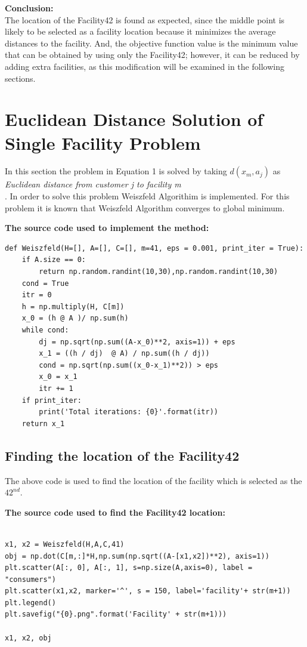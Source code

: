 \documentclass[12pt]{article}
\begin{document}
\textbf{Conclusion:}\\
The location of the Facility42 is found as expected, since the middle point is likely to be selected as a facility location because it minimizes the average distances to the facility. And, the objective function value is the minimum value that can be obtained by using only the Facility42; however, it can be reduced by adding extra facilities, as this modification will be examined in the following sections.

\section{Euclidean Distance Solution of Single Facility Problem}
In this section the problem in Equation 1 is solved by taking $d(x_m,a_j)$  as \textit{Euclidean distance from customer j to facility m} \\. In order to solve this problem Weiszfeld Algorithim is implemented. For this problem it is known that Weiszfeld Algorithm converges to global minimum.

\textbf{The source code used to implement the method:}
\begin{lstlisting}[style=pythonstyle]
def Weiszfeld(H=[], A=[], C=[], m=41, eps = 0.001, print_iter = True):
    if A.size == 0:
        return np.random.randint(10,30),np.random.randint(10,30)
    cond = True
    itr = 0
    h = np.multiply(H, C[m])
    x_0 = (h @ A )/ np.sum(h)
    while cond:
        dj = np.sqrt(np.sum((A-x_0)**2, axis=1)) + eps
        x_1 = ((h / dj)  @ A) / np.sum((h / dj))
        cond = np.sqrt(np.sum((x_0-x_1)**2)) > eps
        x_0 = x_1
        itr += 1
    if print_iter:
        print('Total iterations: {0}'.format(itr))
    return x_1
\end{lstlisting}

\subsection{Finding the location of the Facility42}
The above code is used to find the location of the facility which is selected as the $42^{nd}$. 

\textbf{The source code used to find the Facility42 location:}
\begin{lstlisting}[style=pythonstyle]

x1, x2 = Weiszfeld(H,A,C,41)
obj = np.dot(C[m,:]*H,np.sum(np.sqrt((A-[x1,x2])**2), axis=1))
plt.scatter(A[:, 0], A[:, 1], s=np.size(A,axis=0), label = "consumers")
plt.scatter(x1,x2, marker='^', s = 150, label='facility'+ str(m+1))
plt.legend()
plt.savefig("{0}.png".format('Facility' + str(m+1)))

x1, x2, obj
\end{lstlisting}
\end{document}

